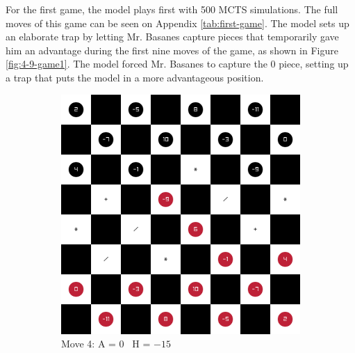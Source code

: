 
For the first game, the model plays first with 500 MCTS simulations. The full moves of this game can be seen on Appendix \ref{tab:first-game}. The model sets up an elaborate trap by letting Mr. Basanes capture pieces that temporarily gave him an advantage during the first nine moves of the game, as shown in Figure \ref{fig:4-9-game1}. The model forced Mr. Basanes to capture the $0$ piece, setting up a trap that puts the model in a more advantageous position.

\begin{figure}[H]
    \centering
    \begin{subfigure}{0.3\textwidth}
        \centering
        \includegraphics[width=\textwidth]{images/games/game1/move_5.png}
        \caption*{Move 4: A = 0 \textbar\ H = $-15$}
    \end{subfigure}
    \quad
    \begin{subfigure}{0.3\textwidth}
        \centering

\end{subfigure}
\end{figure}
